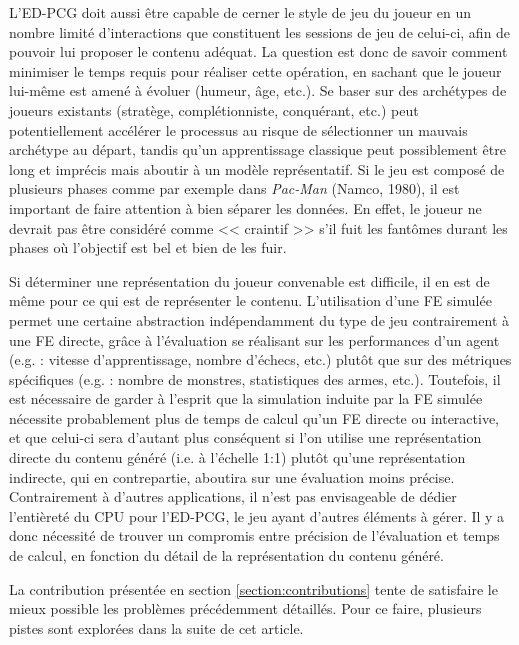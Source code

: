 \documentclass[a4paper,11pt]{article}
\begin{document}
      L'ED-PCG doit aussi être capable de cerner le style de jeu du joueur en un nombre limité d'interactions que constituent les sessions de jeu de celui-ci, afin de pouvoir lui proposer le contenu adéquat.
      La question est donc de savoir comment minimiser le temps requis pour réaliser cette opération, en sachant que le joueur lui-même est amené à évoluer (humeur, âge, etc.).
      Se baser sur des archétypes de joueurs existants (stratège, complétionniste, conquérant, etc.) \cite{Nacke} peut potentiellement accélérer le processus au risque de sélectionner un mauvais archétype au départ, tandis qu'un apprentissage classique peut possiblement être long et imprécis mais aboutir à un modèle représentatif.
      Si le jeu est composé de plusieurs phases comme par exemple dans \textit{Pac-Man} (Namco, 1980), il est important de faire attention à bien séparer les données. 
      En effet, le joueur ne devrait pas être considéré comme << craintif >> s'il fuit les fantômes durant les phases où l'objectif est bel et bien de les fuir.

      Si déterminer une représentation du joueur convenable est difficile, il en est de même pour ce qui est de représenter le contenu.
      L'utilisation d'une FE simulée permet une certaine abstraction indépendamment du type de jeu contrairement à une FE directe, grâce à l'évaluation se réalisant sur les performances d'un agent (e.g. : vitesse d'apprentissage, nombre d'échecs, etc.) plutôt que sur des métriques spécifiques (e.g. : nombre de monstres, statistiques des armes, etc.).
      Toutefois, il est nécessaire de garder à l'esprit que la simulation induite par la FE simulée nécessite probablement plus de temps de calcul qu'un FE directe ou interactive, et que celui-ci sera d'autant plus conséquent si l'on utilise une représentation directe du contenu généré (i.e. à l'échelle 1:1) plutôt qu'une représentation indirecte, qui en contrepartie, aboutira sur une évaluation moins précise.
      Contrairement à d'autres applications, il n'est pas envisageable de dédier l'entièreté du CPU pour l'ED-PCG, le jeu ayant d'autres éléments à gérer. 
      Il y a donc nécessité de trouver un compromis entre précision de l'évaluation et temps de calcul, en fonction du détail de la représentation du contenu généré.

      La contribution présentée en section \ref{section:contributions} tente de satisfaire le mieux possible les problèmes précédemment détaillés.
      Pour ce faire, plusieurs pistes sont explorées dans la suite de cet article.
\end{document}
